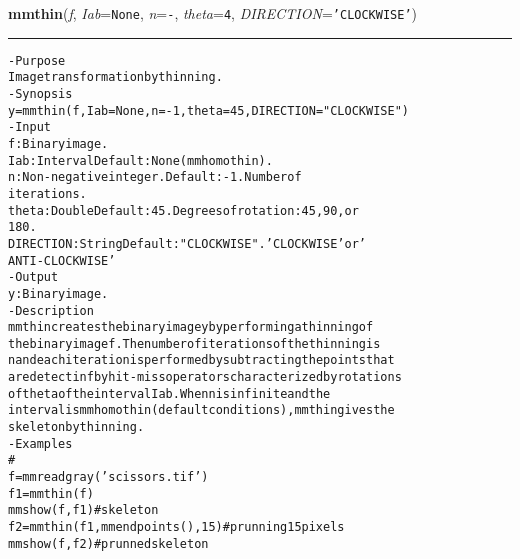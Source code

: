     \begin{boxedminipage}{\textwidth}

    \raggedright \textbf{mmthin}(\textit{f}, \textit{Iab}=\texttt{N\-o\-n\-e\-}, \textit{n}=\texttt{-\-}, \textit{theta}=\texttt{4\-}, \textit{DIRECTION}=\texttt{'\-C\-L\-O\-C\-K\-W\-I\-S\-E\-'\-})

    \vspace{-1.5ex}

    \rule{\textwidth}{0.5\fboxrule}
\begin{alltt}
- Purpose
    Image transformation by thinning.
- Synopsis
    y = mmthin(f, Iab=None, n=-1, theta=45, DIRECTION="CLOCKWISE")
- Input
    f:         Binary image.
    Iab:       Interval Default: None (mmhomothin).
    n:         Non-negative integer. Default: -1. Number of
               iterations.
    theta:     Double Default: 45. Degrees of rotation: 45, 90, or
               180.
    DIRECTION: String Default: "CLOCKWISE". 'CLOCKWISE' or '
               ANTI-CLOCKWISE'
- Output
    y: Binary image.
- Description
    mmthin creates the binary image y by performing a thinning of
    the binary image f . The number of iterations of the thinning is
    n and each iteration is performed by subtracting the points that
    are detect in f by hit-miss operators characterized by rotations
    of theta of the interval Iab . When n is infinite and the
    interval is mmhomothin (default conditions), mmthin gives the
    skeleton by thinning.
- Examples
    \#
    f=mmreadgray('scissors.tif')
    f1=mmthin(f)
    mmshow(f,f1) \# skeleton
    f2=mmthin(f1,mmendpoints(),15) \# prunning 15 pixels
    mmshow(f,f2) \# prunned skeleton\end{alltt}

    \vspace{1ex}

    \end{boxedminipage}

    \label{multireg:num_pymorph:mmthreshad}
    \vspace{0.5ex}

